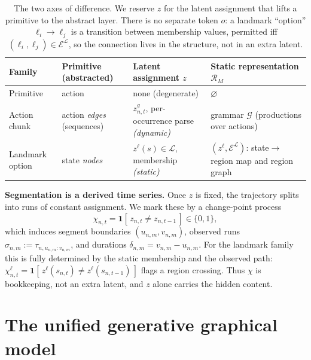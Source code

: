 \documentclass[11pt]{article}
\begin{document}
\begin{table}[htbp]
\centering
\small
\begin{tabularx}{\textwidth}{lllY}
\toprule
Family & Primitive (abstracted) & Latent assignment $z$ & Static representation $\mathcal R_M$ \\
\midrule
Primitive & action & none (degenerate) & $\varnothing$ \\
Action chunk & action \emph{edges} (sequences) & $z^{g}_{n,t}$, per-occurrence parse \emph{(dynamic)} &
grammar $\mathcal G$ (productions over actions) \\
Landmark option & state \emph{nodes} & $z^{\ell}(s)\in\mathcal L$, membership \emph{(static)} &
$(z^{\ell},\mathcal E^{\mathcal L})$: state$\to$region map and region graph \\
\bottomrule
\end{tabularx}
\caption{The two axes of difference. We reserve $z$ for the latent assignment that lifts a
primitive to the abstract layer. There is no separate token $o$: a landmark ``option''
$\ell_i\!\to\!\ell_j$ is a transition between membership values, permitted iff
$(\ell_i,\ell_j)\in\mathcal E^{\mathcal L}$, so the connection lives in the structure, not in
an extra latent.}
\label{tab:hidden}
\end{table}

\textbf{Segmentation is a derived time series.} Once $z$ is fixed, the trajectory splits
into runs of constant assignment. We mark these by a change-point process
\begin{equation}
\chi_{n,t}=\mathbf 1[\,z_{n,t}\neq z_{n,t-1}\,]\in\{0,1\},
\label{eq:changepoint}
\end{equation}
which induces segment boundaries $(u_{n,m},v_{n,m})$, observed runs
$\sigma_{n,m}:=\tau_{n,u_{n,m}:v_{n,m}}$, and durations $\delta_{n,m}=v_{n,m}-u_{n,m}$. For
the landmark family this is fully determined by the static membership and the observed path:
$\chi^{\ell}_{n,t}=\mathbf 1[\,z^{\ell}(s_{n,t})\neq z^{\ell}(s_{n,t-1})\,]$ flags a
region crossing. Thus $\chi$ is bookkeeping, not an extra latent, and $z$ alone carries the
hidden content.

\section{The unified generative graphical model}
\end{document}
